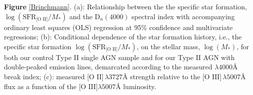 \label{Brinchmann} \textbf{Figure} \ref{Brinchmann}. (a): Relationship between the the specific star formation, $\log{(\text{SFR}_{\text{[O II]}}/M_{*})}$ and the $\text{D}_{n}(4000)$ spectral index with accompanying ordinary least squares (OLS) regression at 95\% confidence and multivariate regressions; (b): Conditional dependence of the star formation history, i.e., the specific star formation $\log{(\text{SFR}_{\text{[O II]}}/M_{*})}$, on the stellar mass, $\log{(M_{*})}$, for both our control Type II single AGN sample and for our Type II AGN with double-peaked emission lines, demarcated according to the measured $\lambda{4000}Å$ break index; (c): measured $\text{[O II]}\,\lambda{3727}Å$ strength relative to the $\text{[O III]}\,\lambda{5007}Å$ flux as a function of the $\text{[O III]}\lambda5007Å$ luminosity.
  